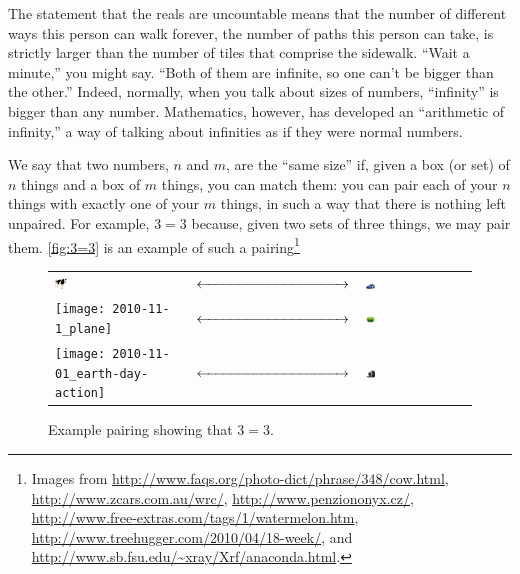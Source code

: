 \documentclass[letterpaper,11pt,showproblems]{pset}
\theoremstyle{definition} \newtheorem{defn}{Definition}[section]
\theoremstyle{definition} \newtheorem*{defn*}{Definition}
\begin{document}
  The statement that the reals are uncountable means that the number of different ways this person can walk forever, the number of paths this person can take, is strictly larger than the number of tiles that comprise the sidewalk.  ``Wait a minute,'' you might say. ``Both of them are infinite, so one can't be bigger than the other.''  Indeed, normally, when you talk about sizes of numbers, ``infinity'' is bigger than any number.  Mathematics, however, has developed an ``arithmetic of infinity,'' a way of talking about infinities as if they were normal numbers.

  We say that two numbers, $n$ and $m$, are the ``same size'' if, given a box (or set) of $n$ things and a box of $m$ things, you can match them: you can pair each of your $n$ things with exactly one of your $m$ things, in such a way that there is nothing left unpaired.  For example, $3 = 3$ because, given two sets of three things, we may pair them.  \autoref{fig:3=3} is an example of such a pairing\footnote{Images from \url{http://www.faqs.org/photo-dict/phrase/348/cow.html}, \url{http://www.zcars.com.au/wrc/}, \url{http://www.penziononyx.cz/}, \url{http://www.free-extras.com/tags/1/watermelon.htm}, \url{http://www.treehugger.com/2010/04/18-week/}, and \url{http://www.sb.fsu.edu/~xray/Xrf/anaconda.html}.}
  
  \begin{figure}[ht]
    \begin{center}
      \begin{tabular}{m{}m{}m{}}
        \includegraphics[width=0.1\textwidth]{2010-11-1_700cow} & $\xleftrightarrow{\hspace{0.3\textwidth}}$ & \includegraphics[width=0.1\textwidth]{2010-11-1_2008-subaru-wrc-concept-car1} \\
        \texttt{[image: 2010-11-1\_plane]} & $\xleftrightarrow{\hspace{0.3\textwidth}}$ & \includegraphics[width=0.1\textwidth]{2010-11-01_watermelon-854} \\
        \texttt{[image: 2010-11-01\_earth-day-action]} & $\xleftrightarrow{\hspace{0.3\textwidth}}$ & \includegraphics[width=0.1\textwidth]{2010-11-01_DellComputer}
      \end{tabular}
    \end{center}
    \caption{Example pairing showing that $3 = 3$.}\label{fig:3=3}
  \end{figure}
\end{document}
